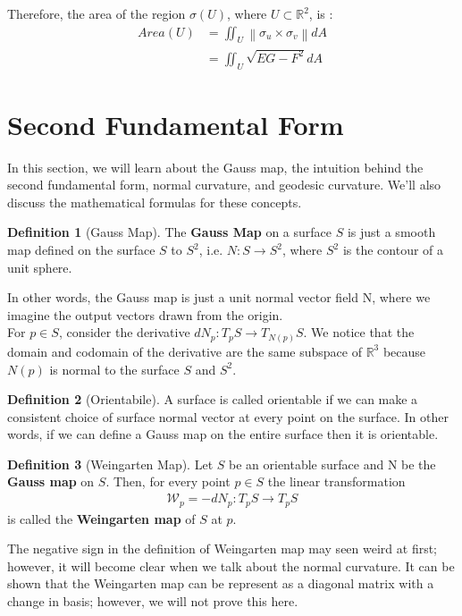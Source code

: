 \documentclass{article}
\theoremstyle{plain}
\theoremstyle{definition}
\newtheorem{definition}{Definition}
\theoremstyle{remark}
\newcommand{\R}{\mathbb{R}}
\begin{document}
Therefore, the area of the region \( \sigma(U) \), where \( U \subset \R^2 \), is :
\begin{align*}
    Area(U) & = \iint_U \left\lVert \sigma_u \times \sigma_v \right\rVert dA \\
            & = \iint_U \sqrt{EG - F^2} dA
\end{align*}

\section{Second Fundamental Form}
In this section, we will learn about the Gauss map, the intuition behind the second fundamental form, normal curvature, and geodesic curvature. We'll also discuss the mathematical formulas for these concepts.

\begin{definition}[Gauss Map]
    The \textbf{Gauss Map} on a surface \(S\) is just a smooth map defined on the surface \(S\) to \(S^2\), i.e. \( N: S \rightarrow S^2 \), where \( S^2\) is the contour of a unit sphere.
\end{definition}
In other words, the Gauss map is just a unit normal vector field N, where we imagine the output vectors drawn from the origin.\\
For \( p \in S\), consider the derivative \(dN_p: T_pS \rightarrow T_{N(p)}S \). We notice that the domain and codomain of the derivative are the same subspace of \( \R^3\) because \(N(p)\) is normal to the surface \(S\) and \(S^2\).

\begin{definition}[Orientabile]
    A surface is called orientable if we can make a consistent choice of surface normal vector at every point on the surface. In other words, if we can define a Gauss map on the entire surface then it is orientable.
\end{definition}
\begin{definition}[Weingarten Map]
    Let \(S\) be an orientable surface and N be the \textbf{Gauss map} on \(S\). Then, for every point \(p \in S \) the linear transformation
    \begin{align*}
        \mathcal{W}_p = -dN_p: T_pS \rightarrow T_pS
    \end{align*}
    is called the \textbf{Weingarten map} of \(S\) at \(p\).
\end{definition}
The negative sign in the definition of Weingarten map may seen weird at first; however, it will become clear when we talk about the normal curvature. It can be shown that the Weingarten map can be represent as a diagonal matrix with a change in basis; however, we will not prove this here.
\end{document}
